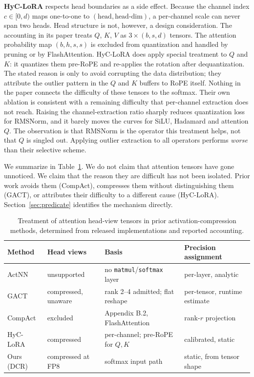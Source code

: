 \documentclass[11pt,letterpaper]{article}
\begin{document}
\textbf{HyC-LoRA} respects head boundaries as a side effect. Because the channel index $c \in [0, d)$ maps one-to-one to $(\text{head}, \text{head-dim})$, a per-channel scale can never span two heads. Head structure is not, however, a design consideration. The accounting in its paper treats $Q$, $K$, $V$ as $3 \times (b, s, d)$ tensors. The attention probability map $(b, h, s, s)$ is excluded from quantization and handled by pruning or by FlashAttention. HyC-LoRA does apply special treatment to $Q$ and $K$: it quantizes them pre-RoPE and re-applies the rotation after dequantization. The stated reason is only to avoid corrupting the data distribution; they attribute the outlier pattern in the $Q$ and $K$ buffers to RoPE itself. Nothing in the paper connects the difficulty of these tensors to the softmax. Their own ablation is consistent with a remaining difficulty that per-channel extraction does not reach. Raising the channel-extraction ratio sharply reduces quantization loss for RMSNorm, and it barely moves the curves for SiLU, Hadamard and attention $Q$. The observation is that RMSNorm is the operator this treatment helps, not that $Q$ is singled out. Applying outlier extraction to all operators performs \emph{worse} than their selective scheme.

We summarize in Table~\ref{tab:related_which}. We do not claim that attention tensors have gone unnoticed. We claim that the reason they are difficult has not been isolated. Prior work avoids them (CompAct), compresses them without distinguishing them (GACT), or attributes their difficulty to a different cause (HyC-LoRA). Section~\ref{sec:predicate} identifies the mechanism directly.

\begin{table}[t]
\centering
\small
\caption{Treatment of attention head-view tensors in prior activation-compression methods, determined from released implementations and reported accounting.}
\label{tab:related_which}
\begin{tabular}{llll}
\toprule
Method & Head views & Basis & Precision assignment \\
\midrule
ActNN & unsupported & no \texttt{matmul}/\texttt{softmax} layer & per-layer, analytic \\
GACT & compressed, unaware & rank 2--4 admitted; flat reshape & per-tensor, runtime estimate \\
CompAct & excluded & Appendix B.2, FlashAttention & rank-$r$ projection \\
HyC-LoRA & compressed & per-channel; pre-RoPE for $Q,K$ & calibrated, static \\
\midrule
Ours (DCR) & compressed at FP8 & softmax input path & static, from tensor shape \\
\bottomrule
\end{tabular}
\end{table}
\end{document}
